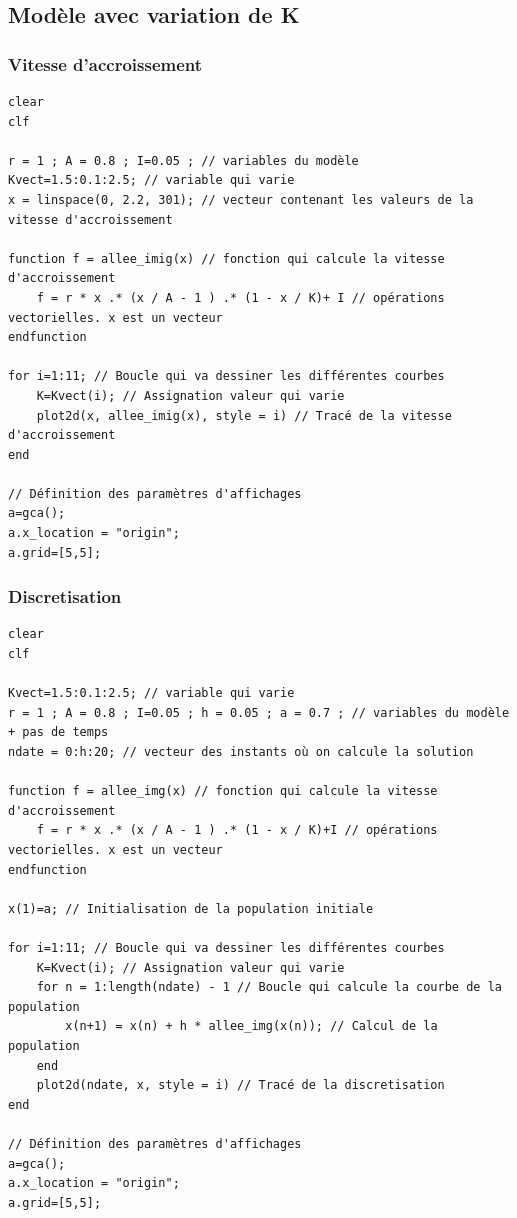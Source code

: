 \documentclass{article}
\begin{document}
\subsection{Modèle avec variation de K}

\subsubsection{Vitesse d'accroissement}

\begin{verbatim}
clear
clf

r = 1 ; A = 0.8 ; I=0.05 ; // variables du modèle
Kvect=1.5:0.1:2.5; // variable qui varie
x = linspace(0, 2.2, 301); // vecteur contenant les valeurs de la vitesse d'accroissement

function f = allee_imig(x) // fonction qui calcule la vitesse d'accroissement
    f = r * x .* (x / A - 1 ) .* (1 - x / K)+ I // opérations vectorielles. x est un vecteur
endfunction

for i=1:11; // Boucle qui va dessiner les différentes courbes
    K=Kvect(i); // Assignation valeur qui varie
    plot2d(x, allee_imig(x), style = i) // Tracé de la vitesse d'accroissement
end

// Définition des paramètres d'affichages
a=gca();
a.x_location = "origin";
a.grid=[5,5];
\end{verbatim}

\subsubsection{Discretisation}

\begin{verbatim}
clear
clf

Kvect=1.5:0.1:2.5; // variable qui varie
r = 1 ; A = 0.8 ; I=0.05 ; h = 0.05 ; a = 0.7 ; // variables du modèle + pas de temps
ndate = 0:h:20; // vecteur des instants où on calcule la solution

function f = allee_img(x) // fonction qui calcule la vitesse d'accroissement
    f = r * x .* (x / A - 1 ) .* (1 - x / K)+I // opérations vectorielles. x est un vecteur
endfunction

x(1)=a; // Initialisation de la population initiale

for i=1:11; // Boucle qui va dessiner les différentes courbes
    K=Kvect(i); // Assignation valeur qui varie
    for n = 1:length(ndate) - 1 // Boucle qui calcule la courbe de la population
        x(n+1) = x(n) + h * allee_img(x(n)); // Calcul de la population
    end 
    plot2d(ndate, x, style = i) // Tracé de la discretisation
end

// Définition des paramètres d'affichages
a=gca();
a.x_location = "origin";
a.grid=[5,5];
\end{verbatim}
\end{document}
